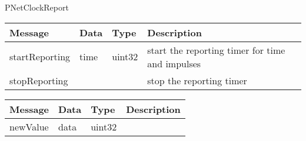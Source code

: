  {PNetClockReport}

\begin{tabular}[ht]{|l|l|l|p{8cm}|}
\hline
Message & Data & Type & Description\\
\hline
startReporting &  time  &  uint32  & %
start the reporting timer for time and impulses
\\
\hline
stopReporting &  &  & %
stop the reporting timer
\\
\hline
\end{tabular}
\begin{tabular}[ht]{|l|l|l|p{8cm}|}
\hline
Message & Data & Type & Description\\
\hline
newValue &  data  &  uint32  & \\
\hline
\end{tabular}

